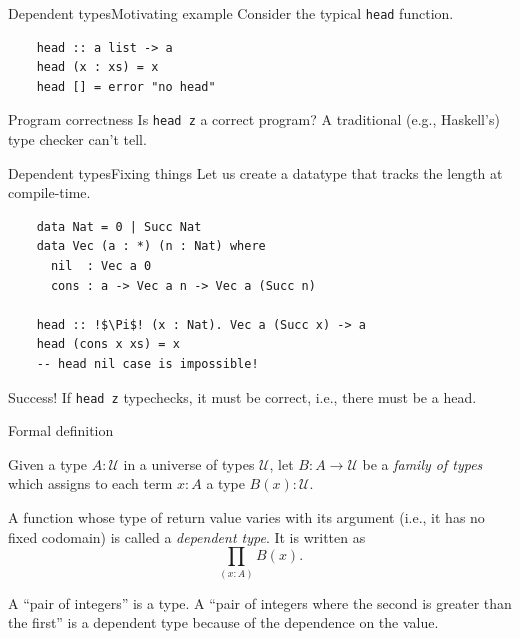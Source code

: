 \documentclass[serif, xcolor={svgnames, table}, usepdftitle=false]{beamer}
\begin{document}
\begin{frame}[fragile]{Dependent types}{Motivating example}
  Consider the typical \texttt{head} function.
  \begin{verbatim}
    head :: a list -> a
    head (x : xs) = x
    head [] = error "no head"
  \end{verbatim}

  \begin{alertblock}{Program correctness}
    Is \texttt{head z} a correct program?  A traditional
    (e.g., Haskell's) type checker can't tell.
  \end{alertblock}
\end{frame}

\begin{frame}[fragile]{Dependent types}{Fixing things}
  Let us create a datatype that tracks the length at compile-time.
  \begin{verbatim}
    data Nat = 0 | Succ Nat
    data Vec (a : *) (n : Nat) where
      nil  : Vec a 0
      cons : a -> Vec a n -> Vec a (Succ n)

    head :: !$\Pi$! (x : Nat). Vec a (Succ x) -> a
    head (cons x xs) = x
    -- head nil case is impossible!
  \end{verbatim}

  \begin{block}{Success!}
    If \texttt{head z} typechecks, it must be correct,
    i.e., there must be a head.
  \end{block}
\end{frame}

\begin{frame}{Formal definition}
  \begin{definition}\label{def:dependent-type}
    Given a type \(A : \mathcal{U}\) in a universe of types
    \(\mathcal{U}\), let \(B \colon A \to \mathcal{U}\) be a
    \emph{family of types} which assigns to each term \(x : A\) a type
    \(B(x) : \mathcal{U}\).

    A function whose type of return value varies with its argument
    (i.e., it has no fixed codomain) is called a \emph{dependent
      type}.  It is written as
    \[
      \prod\limits_{(x : A)} B(x)\text{.}
    \]
  \end{definition}

  A ``pair of integers'' is a type.  A ``pair of integers where the
  second is greater than the first'' is a dependent type because of
  the dependence on the value.
\end{frame}
\end{document}
